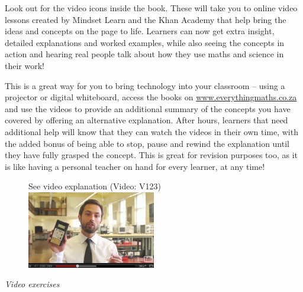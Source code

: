 {\Large

Look out for the video icons inside the book. These will take you to online video lessons created by Mindset
Learn and the Khan Academy that help bring the ideas and concepts on the page to life. Learners can now get extra insight, detailed
explanations and worked examples, while also seeing the concepts in action and hearing real people talk about how they use maths and science in their work!  \par

This is a great way for you to bring technology into your classroom – using a projector or digital whiteboard, access the books on \underline{www.everythingmaths.co.za} and use the videos to provide an additional summary of the concepts you have covered by offering an alternative explanation. After hours, learners that need additional help will know that they can watch the videos in their own time, with the added bonus of being able to stop, pause and rewind the explanation until they have fully grasped the concept. This is great for revision purposes too, as it is like having a personal teacher on hand for every learner, at any time! \par
\begin{figure}[h]
\begin{center}
See video explanation  (Video: V123)\\
\includegraphics[width=0.5\textwidth]{../title_images/veritasiumvideo.png}
\end{center}
\end{figure}

}


\vspace{0.5cm}
{\normalfont\sffamily\fontsize{22}\normalfont\itshape Video exercises} \par

